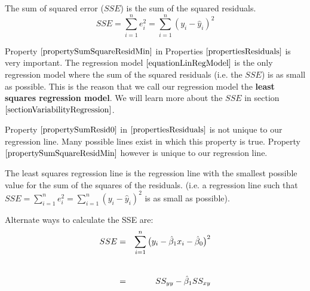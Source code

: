 \begin{definition}
The sum of squared error ($SSE$) is the sum of the squared residuals.
	\begin{equation}
	\label{equationSSE}
	SSE = \sum_{i=1}^{n} e_{i}^{2} = \sum_{i=1}^{n} (y_{i} - \hat{y}_{i})^{2}
	\end{equation}
\end{definition}
\hfill

Property $\ref{propertySumSquareResidMin}$ in 
Properties $\ref{propertiesResiduals}$ is very important.
The regression model $\ref{equationLinRegModel}$ is the only
regression model where the sum of the squared residuals (i.e. the $SSE$) is as small as possible.
This is the reason that we call our regression model
the \textbf{least squares regression model}.
We will learn more about the $SSE$ in section $\ref{sectionVariabilityRegression}$.

\begin{nt}
	Property $\ref{propertySumResid0}$ in $\ref{propertiesResiduals}$ is 
	not unique to our regression line. 
	Many possible lines exist in which this property is true.
	Property $\ref{propertySumSquareResidMin}$ however is unique
	to our regression line.
\end{nt}

\begin{definition}	
The least squares regression line is the regression line with the 
smallest possible value for the sum of the squares of the residuals.
(i.e. a regression line such that 
$SSE = \sum_{i=1}^{n} e_{i}^{2} = \sum_{i=1}^{n} (y_{i} - \hat{y}_{i})^{2}$
is as small as possible).
\end{definition}

\begin{nt}
Alternate ways to calculate the SSE are:
	\begin{eqnarray}
		SSE		& = &	\sum_{i=1}^{n} \big( y_{i} - \hat{\beta}_{1} x_{i} - \hat{\beta}_{0} \big)^{2}	\\
			\hfill \nonumber\\[0.5em]
				& = &	SS_{yy} - \hat{\beta}_{1} SS_{xy}
	\end{eqnarray}
\end{nt}


